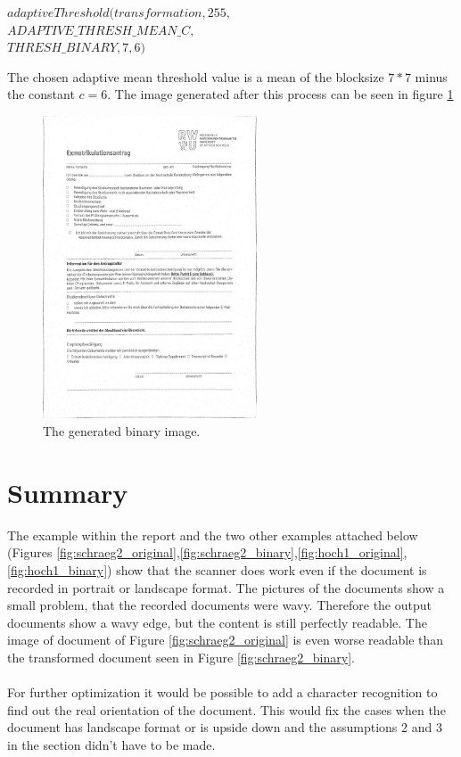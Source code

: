 \documentclass[twocolumn,10pt]{asme2ej}
\begin{document}
\begin{center}
    \noindent
    $adaptiveThreshold(transformation,255,$\\
    $ADAPTIVE\_THRESH\_MEAN\_C, $\\
    $THRESH\_BINARY,7,6)$
\end{center}
\noindent
 \noindent
The chosen adaptive mean threshold value is a mean of the blocksize $7*7$ minus the constant $c=6$.
The image generated after this process can be seen in figure \ref{fig:binary}

\begin{figure}[H]
    \centerline{\includegraphics[width=2.5in]{output/hoch_3_8_adaptive_binary_image_mean.jpg}}
    \caption{The generated binary image.}
    \label{fig:binary}
\end{figure}

\section{Summary}
\noindent
The example within the report and the two other examples attached below (Figures \ref{fig:schraeg2_original},\ref{fig:schraeg2_binary},\ref{fig:hoch1_original},\ref{fig:hoch1_binary}) show that the scanner does work even if the document is recorded in portrait or landscape format. The pictures of the documents show a small problem, that the recorded documents were wavy. Therefore the output documents show a wavy edge, but the content is still perfectly readable. The image of document of Figure \ref{fig:schraeg2_original} is even worse readable than the transformed document seen in Figure \ref{fig:schraeg2_binary}.\\\\
For further optimization it would be possible to add a character recognition to find out the real orientation of the document. This would fix the cases when the document has landscape format or is upside down and the assumptions 2 and 3 in the section  didn't have to be made.
\end{document}

